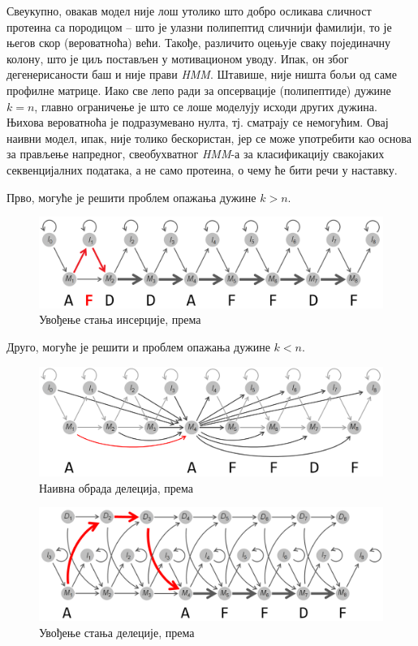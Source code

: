 \documentclass[12pt,oneside]{memoir}
\begin{document}
\begin{CJK}{UTF8}{ipxm}
Свеукупно, овакав модел није лош утолико што добро осликава сличност протеина са породицом -- што је улазни полипептид сличнији фамилији, то је његов скор (вероватноћа) већи. Такође, различито оцењује сваку појединачну колону, што је циљ постављен у мотивационом уводу. Ипак, он због дегенерисаности баш и није прави \textit{HMM}. Штавише, није ништа бољи од саме профилне матрице. Иако све лепо ради за опсервације (полипептиде) дужине $k = n$, главно ограничење је што се лоше моделују исходи других дужина. Њихова вероватноћа је подразумевано нулта, тј. сматрају се немогућим. Овај наивни модел, ипак, није толико бескористан, јер се може употребити као основа за прављење напредног, свеобухватног \textit{HMM}-а за класификацију свакојаких секвенцијалних података, а не само протеина, о чему ће бити речи у наставку.

Прво, могуће је решити проблем опажања дужине $k > n$.

\begin{figure}[!ht]
  \centering
  \includegraphics[width=\textwidth]{insercije.png}
  \caption{Увођење стања инсерције, према \cite{compeau2015}}
  \label{fig:insercije}
\end{figure}

Друго, могуће је решити и проблем опажања дужине $k < n$.

\begin{figure}[!ht]
  \centering
  \includegraphics[width=\textwidth]{delecije1.png}
  \caption{Наивна обрада делеција, према \cite{compeau2015}}
  \label{fig:delecije1}
\end{figure}

\begin{figure}[!ht]
  \centering
  \includegraphics[width=\textwidth]{delecije2.png}
  \caption{Увођење стања делеције, према \cite{compeau2015}}
  \label{fig:delecije2}
\end{figure}


\end{CJK}
\end{document}
